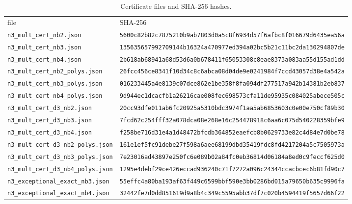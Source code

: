 \documentclass[aps,prx,reprint,superscriptaddress,nobibnotes,longbibliography]{revtex4-2}
\begin{document}
\begin{table}[t]
\caption{Certificate files and SHA-256 hashes.}
\label{tab:S7}
\small
\begin{ruledtabular}
\begin{tabular}{ll}
file & SHA-256\\
\colrule
\texttt{n3\_mult\_cert\_nb2.json} & \texttt{\scriptsize 5600c82b82c7875210b9ab7803d0a5c8f6934d57f6afbc8f016679d6435ea56a}\\
\texttt{n3\_mult\_cert\_nb3.json} & \texttt{\scriptsize 135635657992709144b16324a470977ed394a02bc5b21c11bc2da130294807de}\\
\texttt{n3\_mult\_cert\_nb4.json} & \texttt{\scriptsize 2b618ab68941a68d53d6a0b678411f65053308c8eae8373a083aa55d155ad1dd}\\
\texttt{n3\_mult\_cert\_nb2\_polys.json} & \texttt{\scriptsize 26fcc456ce8341f10d34c8c6abca08d04de9e0241984f7ccd43057d38e4a542a}\\
\texttt{n3\_mult\_cert\_nb3\_polys.json} & \texttt{\scriptsize 016233445a4e8139c07dce862e1be358f8fa094df277517a942b14381b2eb837}\\
\texttt{n3\_mult\_cert\_nb4\_polys.json} & \texttt{\scriptsize 9d944ec1dcacfb1a26216cae008fec698573cfa11de95935c084025abece505c}\\
\texttt{n3\_mult\_cert\_d3\_nb2.json} & \texttt{\scriptsize 20cc93dfe011ab6fc20925a5310bdc3974f1aa5ab6853603c0e00e750cf89b30}\\
\texttt{n3\_mult\_cert\_d3\_nb3.json} & \texttt{\scriptsize 7fcd62c254fff32a078dca08e268e16c254478918c6aa6c075d540228359bfe9}\\
\texttt{n3\_mult\_cert\_d3\_nb4.json} & \texttt{\scriptsize f258be716d31e4a1d48472bfcdb364852eaefcb8b0629733e82c4d84e7d0be78}\\
\texttt{n3\_mult\_cert\_d3\_nb2\_polys.json} & \texttt{\scriptsize 161e1ef5fc91debe27f598a6aee68199dbd35419fdc8fd4217204a5c7505973a}\\
\texttt{n3\_mult\_cert\_d3\_nb3\_polys.json} & \texttt{\scriptsize 7e23016ad43897e250fc6e089b02a84fc0eb36814d06184a8ed0c9feccf625d0}\\
\texttt{n3\_mult\_cert\_d3\_nb4\_polys.json} & \texttt{\scriptsize 1295e4debf29ce426eccad936240c71f7272a096c24344ccacbcec6b81fd90c7}\\
\texttt{n3\_exceptional\_exact\_nb3.json} & \texttt{\scriptsize 55effc4a80ba193af63f449c6599bbf590e3bb0286bd015a79650b635c9996fa}\\
\texttt{n3\_exceptional\_exact\_nb4.json} & \texttt{\scriptsize 32442fe7d0dd851619d9a8b4c349c5595abb37df7c020b4594419f5657d66f22}\\

\end{tabular}
\end{ruledtabular}
\end{table}
\end{document}

